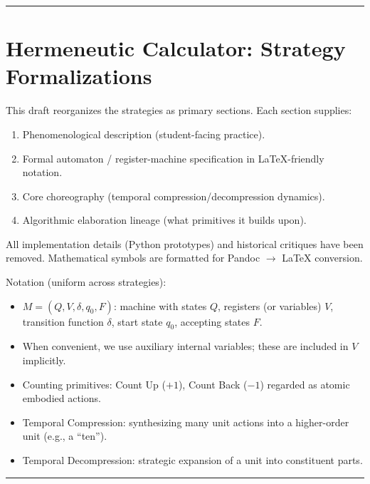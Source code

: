 \documentclass[12pt]{book}
\begin{document}
\begin{center}\rule{0.5\linewidth}{0.5pt}\end{center}

\section{Hermeneutic Calculator: Strategy
Formalizations}\label{hermeneutic-calculator-strategy-formalizations}

This draft reorganizes the strategies as primary sections. Each section
supplies:

\begin{enumerate}
\def\labelenumi{\arabic{enumi}.}
 
\item
  Phenomenological description (student-facing practice).
\item
  Formal automaton / register-machine specification in LaTeX-friendly
  notation.
\item
  Core choreography (temporal compression/decompression dynamics).
\item
  Algorithmic elaboration lineage (what primitives it builds upon).
\end{enumerate}

All implementation details (Python prototypes) and historical critiques
have been removed. Mathematical symbols are formatted for Pandoc \(\to\)
LaTeX conversion.

Notation (uniform across strategies):

\begin{itemize}
 
\item
  \(M = (Q, V, \delta, q_0, F)\): machine with states \(Q\), registers
  (or variables) \(V\), transition function \(\delta\), start state
  \(q_0\), accepting states \(F\).
\item
  When convenient, we use auxiliary internal variables; these are
  included in \(V\) implicitly.
\item
  Counting primitives: Count Up (\(+1\)), Count Back (\(-1\)) regarded
  as atomic embodied actions.
\item
  Temporal Compression: synthesizing many unit actions into a
  higher-order unit (e.g., a ``ten'').
\item
  Temporal Decompression: strategic expansion of a unit into constituent
  parts.
\end{itemize}

\begin{center}\rule{0.5\linewidth}{0.5pt}\end{center}
\end{document}
